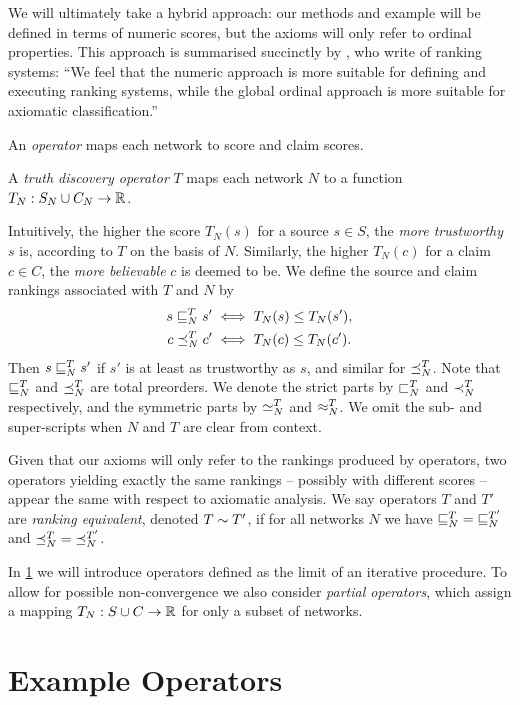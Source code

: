 We will ultimately take a hybrid approach: our methods and example will be
defined in terms of numeric scores, but the axioms will only refer to ordinal
properties. This approach is summarised succinctly by \textcite{altman2008},
who write of ranking systems: ``We feel that the numeric approach is more
suitable for defining and executing ranking systems, while the global ordinal
approach is more suitable for axiomatic classification.''

An \emph{operator} maps each network to score and claim scores.

\begin{definition}
    A \emph{truth discovery operator} $T$ maps each network $N$ to a function
    $T_N: S_N \cup C_N \to \mathbb{R}$.
\end{definition}

Intuitively, the higher the score $T_N(s)$ for a source $s \in S$, the
\emph{more trustworthy} $s$ is, according to $T$ on the basis of $N$.
Similarly, the higher $T_N(c)$ for a claim $c \in C$, the \emph{more
believable} $c$ is deemed to be. We define the source and claim rankings
associated with $T$ and $N$ by
\begin{align*}
    s \sqsubseteq_N^T s' &\iff T_N(s) \le T_N(s'), \\
    c \preceq_N^T c' &\iff T_N(c) \le T_N(c').
\end{align*}
Then $s \sqsubseteq_N^T s'$ if $s'$ is at least as trustworthy as $s$, and similar for
$\preceq_N^T$. Note that $\sqsubseteq_N^T$ and $\preceq_N^T$ are total preorders. We denote
the strict parts by $\sqsubset_N^T$ and $\prec_N^T$ respectively, and the symmetric
parts by $\simeq_N^T$ and $\approx_N^T$. We omit the sub- and super-scripts when
$N$ and $T$ are clear from context.

Given that our axioms will only refer to the rankings produced by operators,
two operators yielding exactly the same rankings -- possibly with different
scores -- appear the same with respect to axiomatic analysis. We say operators
$T$ and $T'$ are \emph{ranking equivalent}, denoted $T \sim T'$, if for
all networks $N$ we have ${\sqsubseteq_N^T} = {\sqsubseteq_N^{T'}}$ and ${\preceq_N^T} =
{\preceq_N^{T'}}$.

In \cref{td_new_sec_example_operators} we will introduce operators defined as
the limit of an iterative procedure. To allow for possible non-convergence we
also consider \emph{partial operators}, which assign a mapping $T_N: S \cup C
\to \mathbb{R}$ for only a subset of networks.

\section{Example Operators}
\label{td_new_sec_example_operators}


